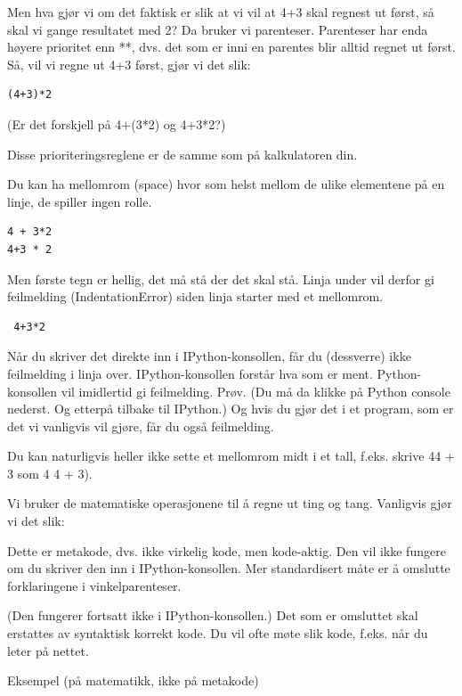 Men hva gjør vi om det faktisk er slik at vi vil at 4+3 skal regnest ut først, så skal vi gange resultatet med 2? Da bruker vi parenteser. Parenteser har enda høyere prioritet enn **, dvs. det som er inni en parentes blir alltid regnet ut først. Så, vil vi regne ut 4+3 først, gjør vi det slik: 
\begin{lstlisting}
(4+3)*2
\end{lstlisting}

(Er det forskjell på 4+(3*2) og 4+3*2?)

Disse prioriteringsreglene er de samme som på kalkulatoren din. 

Du kan ha mellomrom (space) hvor som helst mellom de ulike elementene på en linje, de spiller ingen rolle.

\begin{lstlisting}
4 + 3*2
4+3 * 2 
\end{lstlisting}

Men første tegn er hellig, det må stå der det skal stå. Linja under vil derfor gi feilmelding (IndentationError) siden linja starter med et mellomrom.
\begin{lstlisting}
 4+3*2
\end{lstlisting}

Når du skriver det direkte inn i IPython-konsollen, får du (dessverre) ikke feilmelding i linja over. IPython-konsollen forstår hva som er ment. Python-konsollen vil imidlertid gi feilmelding. Prøv. (Du må da klikke på Python console nederst. Og etterpå tilbake til IPython.) Og hvis du gjør det i et program, som er det vi vanligvis vil gjøre, får du også feilmelding. 

Du kan naturligvis heller ikke sette et mellomrom midt i et tall, f.eks. skrive 44 + 3 som 4 4 + 3). 

Vi bruker de matematiske operasjonene til å regne ut ting og tang. Vanligvis gjør vi det slik:


Dette er metakode, dvs. ikke virkelig kode, men kode-aktig. Den vil ikke fungere om du skriver den inn i IPython-konsollen. Mer standardisert måte er å omslutte forklaringene i vinkelparenteser.


(Den fungerer fortsatt ikke i IPython-konsollen.) Det som er omsluttet skal erstattes av syntaktisk korrekt kode. Du vil ofte møte slik kode, f.eks. når du leter på nettet.

Eksempel (på matematikk, ikke på metakode)

